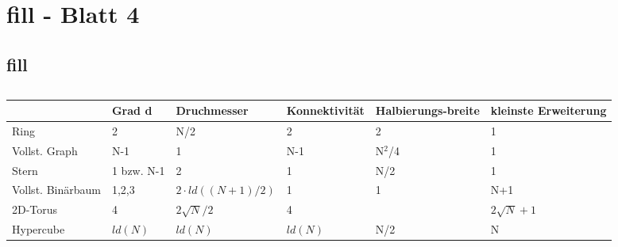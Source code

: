 \section{fill - Blatt 4}
\subsection{fill}
\subsection{}
\begin{tabularx}{\textwidth}{|X|X|X|X|X|X|}
\hline
&Grad d &Druchmesser &Konnektivität &Halbierungs-breite &kleinste Erweiterung\\
\hline
Ring &2 &N/2 &2 &2 &1 \\
\hline
Vollst. Graph &N-1 &1 &N-1 &N$^2$/4 &1\\
\hline
Stern &1 bzw. N-1 &2 &1 &N/2 &1\\
\hline
Vollst. Binärbaum &1,2,3 &$2\cdot ld((N+1)/2)$ &1 &1 &N+1\\
\hline
2D-Torus &4 &$2\sqrt{N}/2$ &4 &&$2\sqrt{N}+1$\\
\hline
Hypercube &$ld(N)$ &$ld(N)$ &$ld(N)$ &N/2 &N\\
\hline
\end{tabularx}
